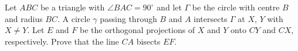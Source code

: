 Let $ABC$ be a triangle with $\angle BAC = 90^\circ$ and let $\Gamma$ be the circle with centre $B$
and radius $BC$. A circle $\gamma$ passing through $B$ and $A$ intersects $\Gamma$ at $X$, $Y$ with
$X \neq Y$. Let $E$ and $F$ be the orthogonal projections of $X$ and $Y$ onto $CY$ and
$CX$, respectively. Prove that the line $CA$ bisects $EF$.
